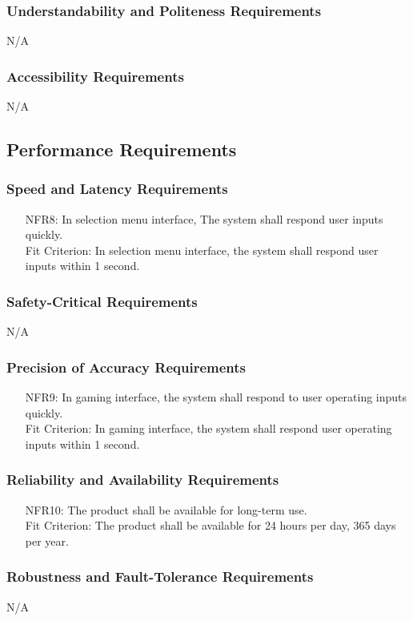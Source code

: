 \documentclass[12pt]{article}
\begin{document}
\subsubsection{Understandability and Politeness Requirements}
N/A
\subsubsection{Accessibility Requirements}
N/A
\subsection{Performance Requirements}
\subsubsection{Speed and Latency Requirements}
\begin{itemize}
\item[NFR8:] In selection menu interface, The system shall respond user inputs quickly.\\
Fit Criterion: In selection menu interface, the system shall respond user inputs within 1 second.
\end{itemize}
\subsubsection{Safety-Critical Requirements}
N/A
\subsubsection{Precision of Accuracy Requirements}
\begin{itemize}
\item[NFR9:] In gaming interface, the system shall respond to user operating inputs quickly.\\
Fit Criterion: In gaming interface, the system shall respond user operating inputs within 1 second.
\end{itemize}
\subsubsection{Reliability and Availability Requirements}
\begin{itemize}
\item[NFR10:] The product shall be available for long-term use. \\
Fit Criterion: The product shall be available for 24 hours per day, 365 days per year.
\end{itemize}
\subsubsection{Robustness and Fault-Tolerance Requirements}
N/A
\end{document}
